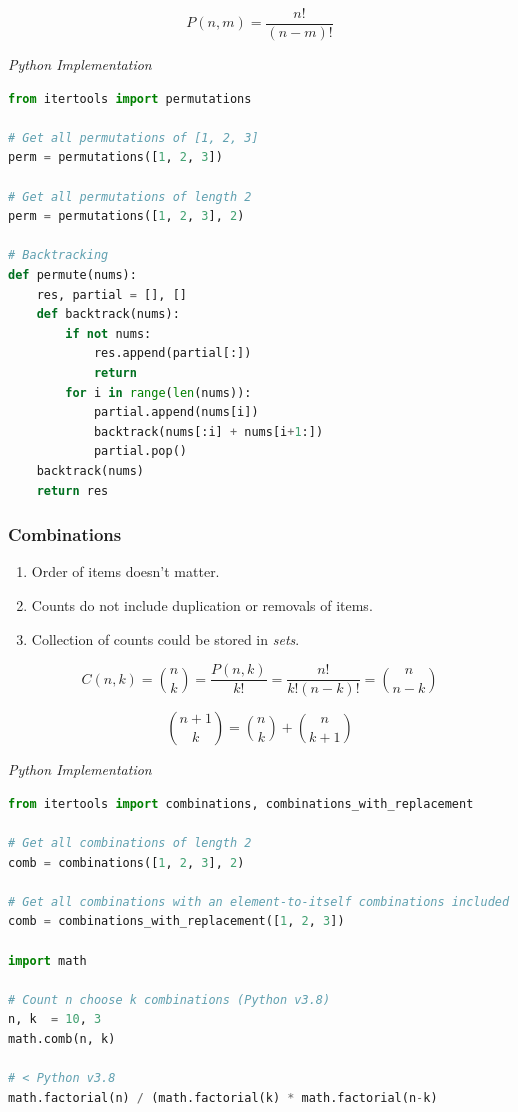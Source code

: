 \documentclass{article}
\begin{document}
    \[
    P(n,m) = \frac{n!}{(n-m)!}
    \]

    
\vspace{8pt} \emph{Python Implementation}
\begin{lstlisting}[language=Python]
from itertools import permutations 

# Get all permutations of [1, 2, 3] 
perm = permutations([1, 2, 3])   

# Get all permutations of length 2 
perm = permutations([1, 2, 3], 2)

# Backtracking
def permute(nums):
    res, partial = [], []
    def backtrack(nums):
        if not nums:
            res.append(partial[:])
            return
        for i in range(len(nums)):
            partial.append(nums[i])
            backtrack(nums[:i] + nums[i+1:])
            partial.pop()
    backtrack(nums)
    return res
\end{lstlisting} 

    \subsubsection{Combinations}
    \begin{enumerate}
        \item Order of items doesn't matter. 
        \item Counts do not include duplication or removals of items.
        \item Collection of counts could be stored in \emph{sets}.
    \end{enumerate}
    
    \[
       C(n, k) = \binom{n}{k} = \frac{P(n,k)}{k!} = \frac{n!}{k!(n-k)!} = \binom{n}{n-k}
    \]
    
    \[
        \binom{n+1}{k} = \binom{n}{k} + \binom{n}{k+1}
    \]

\vspace{8pt} \emph{Python Implementation}
\begin{lstlisting}[language=Python]
from itertools import combinations, combinations_with_replacement

# Get all combinations of length 2 
comb = combinations([1, 2, 3], 2)

# Get all combinations with an element-to-itself combinations included 
comb = combinations_with_replacement([1, 2, 3])

import math

# Count n choose k combinations (Python v3.8)
n, k  = 10, 3
math.comb(n, k)

# < Python v3.8
math.factorial(n) / (math.factorial(k) * math.factorial(n-k)

\end{lstlisting}
\end{document}
